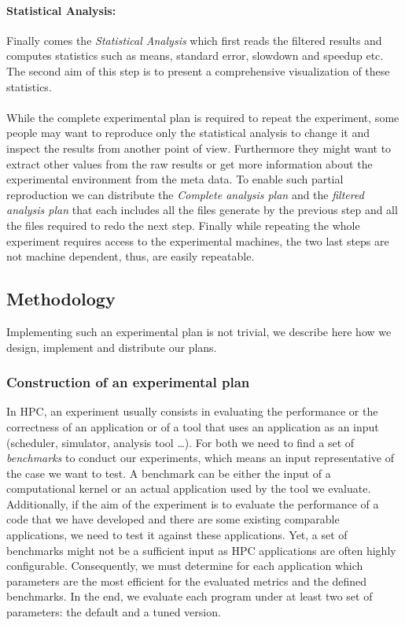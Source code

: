 \paragraph{Statistical Analysis:}
Finally comes the \emph{Statistical Analysis} which first reads the filtered results and computes statistics such as means, standard error, slowdown and speedup etc.
The second aim of this step is to present a comprehensive visualization of these statistics.

\paragraph{}
While the complete experimental plan is required to repeat the experiment, some people may want to reproduce only the statistical analysis to change it and inspect the results from another point of view.
Furthermore they might want to extract other values from the raw results or get more information about the experimental environment from the meta data.
To enable such partial reproduction we can distribute the \emph{Complete analysis plan} and the \emph{filtered analysis plan} that each includes all the files generate by the previous step and all the files required to redo the next step.
Finally while repeating the whole experiment requires access to the experimental machines, the two last steps are not machine dependent, thus, are easily repeatable.

\subsection{Methodology}

Implementing such an experimental plan is not trivial, we describe here how we design, implement and distribute our plans.

\subsubsection{Construction of an experimental plan}

In \gls{HPC}, an experiment usually consists in evaluating the performance or the correctness of an application or of a tool that uses an application as an input (scheduler, simulator, analysis tool \ldots).
For both we need to find a set of \emph{benchmarks} to conduct our experiments, which means an input representative of the case we want to test.
A benchmark can be either the input of a computational kernel or an actual application used by the tool we evaluate.
Additionally, if the aim of the experiment is to evaluate the performance of a code that we have developed and there are some existing comparable applications, we need to test it against these applications.
Yet, a set of benchmarks might not be a sufficient input as \gls{HPC} applications are often highly configurable.
Consequently, we must determine for each application which parameters are the most efficient for the evaluated metrics and the defined benchmarks.
In the end, we evaluate each program under at least two set of parameters: the default and a tuned version.


